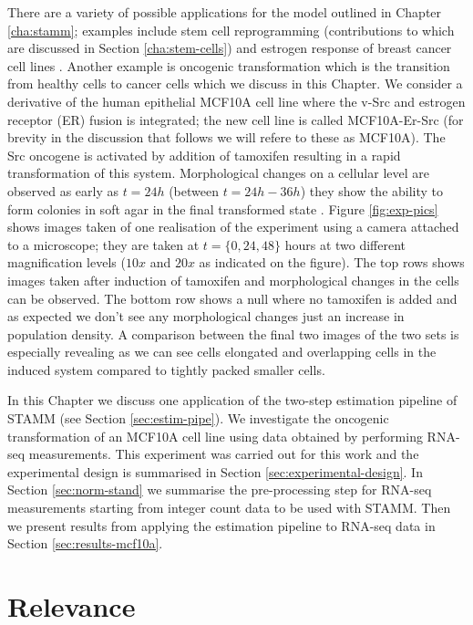 There are a variety of possible applications for the model outlined in Chapter \ref{cha:stamm}; examples include stem cell reprogramming \citep{Armond:2013} (contributions to which are discussed in Section \ref{cha:stem-cells}) and estrogen response of breast cancer cell lines \citep{Casale:2013}. Another example is oncogenic transformation which is the transition from healthy cells to cancer cells which we discuss in this Chapter. We consider a derivative of the human epithelial MCF10A cell line where the v-Src and estrogen receptor (ER) fusion is integrated; the new cell line is called MCF10A-Er-Src \citep{Hirsch:2010ec} (for brevity in the discussion that follows we will refere to these as MCF10A). The Src oncogene is activated by addition of tamoxifen resulting in a rapid transformation of this system. Morphological changes on a cellular level are observed as early as $t=24h$ (between $t=24h-36h$) they show the ability to form colonies in soft agar in the final transformed state \citep{Hirsch:2010ec} . Figure \ref{fig:exp-pics} shows images taken of one realisation of the experiment using a camera attached to a microscope; they are taken at $t= \lbrace 0, 24, 48 \rbrace$ hours at two different magnification levels ($10x$ and $20x$ as indicated on the figure). The top rows shows images taken after induction of tamoxifen and morphological changes in the cells can be observed. The bottom row shows a null where no tamoxifen is added and as expected we don't see any morphological changes just an increase in population density. A comparison between the final two images of the two sets is especially revealing as we can see cells elongated and overlapping cells in the induced system compared to tightly packed smaller cells.

In this Chapter we discuss one application of the two-step estimation pipeline of STAMM (see Section \ref{sec:estim-pipe}). We investigate the oncogenic transformation of an MCF10A cell line using  data obtained by performing RNA-seq measurements. This experiment was carried out for this work and the experimental design is summarised in Section \ref{sec:experimental-design}. In Section \ref{sec:norm-stand} we summarise the pre-processing step for RNA-seq measurements starting from integer count data to be used with STAMM. Then we present results from applying the estimation pipeline to RNA-seq data in Section \ref{sec:results-mcf10a}.

\section{Relevance}
\label{sec:relevance}

